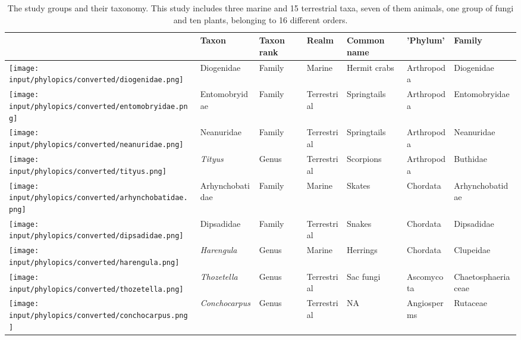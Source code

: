 \documentclass[fleqn,10pt,lineno]{wlpeerj} %
\begin{document}
\begin{table}
\caption{\label{tab:tabletaxa}The study groups and their taxonomy. This study includes three marine and 15 terrestrial taxa, seven of them animals, one group of fungi and ten plants, belonging to 16 different orders.}
\centering
\fontsize{11}{13}\selectfont
\begin{tabular}[t]{>{\raggedright\arraybackslash}p{1cm}>{\raggedright\arraybackslash}p{2.5cm}>{\raggedright\arraybackslash}p{1.5cm}>{\raggedright\arraybackslash}p{2cm}>{\raggedright\arraybackslash}p{2cm}>{\raggedright\arraybackslash}p{2cm}>{\raggedright\arraybackslash}p{3cm}}
\toprule
 & Taxon & Taxon rank & Realm & Common name & 'Phylum' & Family\\
\midrule
\texttt{[image: input/phylopics/converted/diogenidae.png]} & Diogenidae & Family & Marine & Hermit crabs & Arthropoda & Diogenidae\\
\texttt{[image: input/phylopics/converted/entomobryidae.png]} & Entomobryidae & Family & Terrestrial & Springtails & Arthropoda & Entomobryidae\\
\texttt{[image: input/phylopics/converted/neanuridae.png]} & Neanuridae & Family & Terrestrial & Springtails & Arthropoda & Neanuridae\\
\texttt{[image: input/phylopics/converted/tityus.png]} & \em{Tityus} & Genus & Terrestrial & Scorpions & Arthropoda & Buthidae\\
\texttt{[image: input/phylopics/converted/arhynchobatidae.png]} & Arhynchobatidae & Family & Marine & Skates & Chordata & Arhynchobatidae\\
\addlinespace
\texttt{[image: input/phylopics/converted/dipsadidae.png]} & Dipsadidae & Family & Terrestrial & Snakes & Chordata & Dipsadidae\\
\texttt{[image: input/phylopics/converted/harengula.png]} & \em{Harengula} & Genus & Marine & Herrings & Chordata & Clupeidae\\
\hline
\texttt{[image: input/phylopics/converted/thozetella.png]} & \em{Thozetella} & Genus & Terrestrial & Sac fungi & Ascomycota & Chaetosphaeriaceae\\
\hline
\texttt{[image: input/phylopics/converted/conchocarpus.png]} & \em{Conchocarpus} & Genus & Terrestrial & NA & Angiosperms & Rutaceae\\

\end{tabular}
\end{table}
\end{document}
